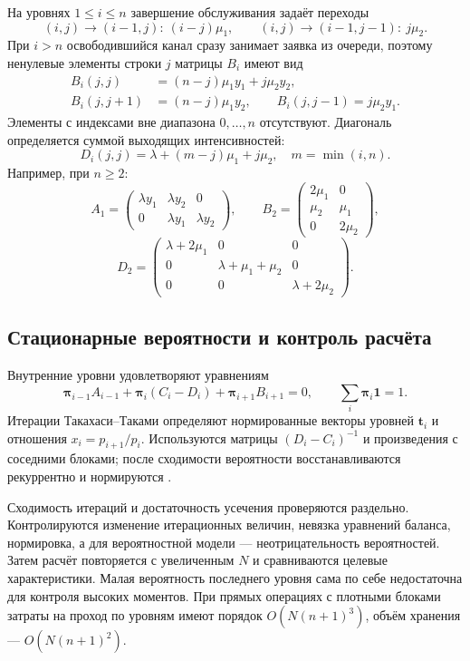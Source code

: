На уровнях \(1\le i\le n\) завершение обслуживания задаёт переходы
\[
(i,j)\to(i-1,j):\ (i-j)\mu_1,\qquad
(i,j)\to(i-1,j-1):\ j\mu_2.
\]
При \(i>n\) освободившийся канал сразу занимает заявка из очереди, поэтому ненулевые элементы строки \(j\) матрицы \(B_i\) имеют вид
\begin{align*}
B_i(j,j)&=(n-j)\mu_1y_1+j\mu_2y_2,\\
B_i(j,j+1)&=(n-j)\mu_1y_2,\qquad
B_i(j,j-1)=j\mu_2y_1.
\end{align*}
Элементы с индексами вне диапазона \(0,\ldots,n\) отсутствуют. Диагональ определяется суммой выходящих интенсивностей:
\[
D_i(j,j)=\lambda+(m-j)\mu_1+j\mu_2,\quad m=\min(i,n).
\]
Например, при \(n\ge2\):
\[
A_1=\begin{pmatrix}\lambda y_1&\lambda y_2&0\\0&\lambda y_1&\lambda y_2\end{pmatrix},\qquad
B_2=\begin{pmatrix}2\mu_1&0\\\mu_2&\mu_1\\0&2\mu_2\end{pmatrix},
\]
\[
D_2=\begin{pmatrix}\lambda+2\mu_1&0&0\\0&\lambda+\mu_1+\mu_2&0\\0&0&\lambda+2\mu_2\end{pmatrix}.
\]

\subsection{Стационарные вероятности и контроль расчёта}
Внутренние уровни удовлетворяют уравнениям
\[
\boldsymbol\pi_{i-1}A_{i-1}+\boldsymbol\pi_i(C_i-D_i)+\boldsymbol\pi_{i+1}B_{i+1}=0,
\qquad \sum_i\boldsymbol\pi_i\mathbf1=1.
\]
Итерации Такахаси--Таками определяют нормированные векторы уровней \(\boldsymbol t_i\) и отношения \(x_i=p_{i+1}/p_i\). Используются матрицы \((D_i-C_i)^{-1}\) и произведения с соседними блоками; после сходимости вероятности восстанавливаются рекуррентно и нормируются \cite{takahashi1976,ryzhikov2018ru}.

Сходимость итераций и достаточность усечения проверяются раздельно. Контролируются изменение итерационных величин, невязка уравнений баланса, нормировка, а для вероятностной модели --- неотрицательность вероятностей. Затем расчёт повторяется с увеличенным \(N\) и сравниваются целевые характеристики. Малая вероятность последнего уровня сама по себе недостаточна для контроля высоких моментов. При прямых операциях с плотными блоками затраты на проход по уровням имеют порядок \(O(N(n+1)^3)\), объём хранения --- \(O(N(n+1)^2)\).

